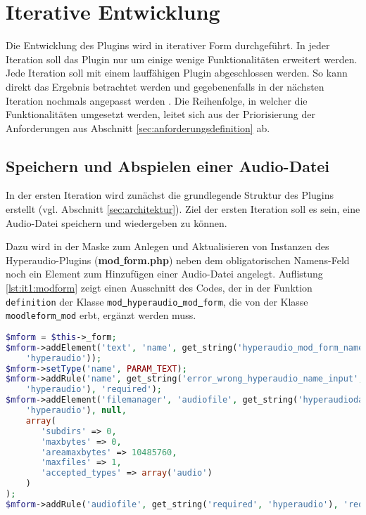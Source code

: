 \section{Iterative Entwicklung}
Die Entwicklung des Plugins wird in iterativer Form durchgeführt. In jeder Iteration soll das Plugin nur um einige wenige Funktionalitäten erweitert werden. Jede Iteration soll mit einem lauffähigen Plugin abgeschlossen werden. So kann direkt das Ergebnis betrachtet werden und gegebenenfalls in der nächsten Iteration nochmals angepasst werden \citep{augsten2018iterativ}. Die Reihenfolge, in welcher die Funktionalitäten umgesetzt werden, leitet sich aus der Priorisierung der Anforderungen aus Abschnitt \ref{sec:anforderungsdefinition} ab.

\subsection{Speichern und Abspielen einer Audio-Datei}
\label{sec:it1}
In der ersten Iteration wird zunächst die grundlegende Struktur des Plugins erstellt (vgl. Abschnitt \ref{sec:architektur}). Ziel der ersten Iteration soll es sein, eine Audio-Datei speichern und wiedergeben zu können.

Dazu wird in der Maske zum Anlegen und Aktualisieren von Instanzen des Hyperaudio-Plugins (\textbf{mod\underline{{ }}form.php}) neben dem obligatorischen Namens-Feld noch ein Element zum Hinzufügen einer Audio-Datei angelegt. Auflistung \ref{lst:it1:modform} zeigt einen Ausschnitt des Codes, der in der Funktion \texttt{definition} der Klasse \texttt{mod\underline{{ }}hyperaudio\underline{{ }}mod\underline{{ }}form}, die von der Klasse \texttt{moodleform\underline{{ }}mod} erbt, ergänzt werden muss. 

\begin{lstlisting}[language=php,
             linewidth=\textwidth,
             caption={Ausschnitt der \textbf{mod\underline{{ }}form.php} in der 1. Iteration},
             label={lst:it1:modform}]
$mform = $this->_form;             
$mform->addElement('text', 'name', get_string('hyperaudio_mod_form_name',
    'hyperaudio'));
$mform->setType('name', PARAM_TEXT);
$mform->addRule('name', get_string('error_wrong_hyperaudio_name_input',
    'hyperaudio'), 'required');
$mform->addElement('filemanager', 'audiofile', get_string('hyperaudiodata',
    'hyperaudio'), null,
    array(
       'subdirs' => 0,
       'maxbytes' => 0,
       'areamaxbytes' => 10485760,
       'maxfiles' => 1,
       'accepted_types' => array('audio')
    )
);
$mform->addRule('audiofile', get_string('required', 'hyperaudio'), 'required');
\end{lstlisting}

